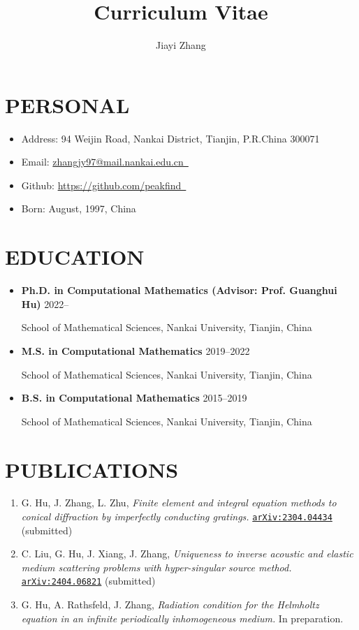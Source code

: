 \documentclass[11pt, letterpaper]{article}
\title{\textbf{Curriculum Vitae}}
\date{}
\author{Jiayi Zhang}
\newcommand{\iconhref}[2]{\href{#1}{#2\ \footnotesize\faExternalLink*}}
\begin{document}
	
	\maketitle
	
	\section{PERSONAL}
	\begin{itemize}[itemsep=1pt]
		\item Address: 94 Weijin Road, Nankai District, Tianjin, P.R.China 300071
		\item Email: \iconhref{mailto:zhangjy97@mail.nankai.edu.cn}{zhangjy97@mail.nankai.edu.cn}
		\item Github: \iconhref{https://github.com/peakfind}{https://github.com/peakfind}
		\item Born: August, 1997, China
	\end{itemize}
	
	\section{EDUCATION}
	\begin{itemize}[itemsep=1pt]
		\item \textbf{Ph.D. in Computational Mathematics (Advisor: Prof. Guanghui Hu)} \hfill 2022--\phantom{2000}
		
		School of Mathematical Sciences, Nankai University, Tianjin, China
		\item \textbf{M.S. in Computational Mathematics} \hfill 2019--2022
		
		School of Mathematical Sciences, Nankai University, Tianjin, China
		\item \textbf{B.S. in Computational Mathematics} \hfill 2015--2019
		
		School of Mathematical Sciences, Nankai University, Tianjin, China
	\end{itemize}

	\section{PUBLICATIONS}
	\begin{enumerate}[itemsep=1pt]
		\item G. Hu, J. Zhang, L. Zhu, \textsl{Finite element and integral equation 
		methods to conical diffraction by imperfectly conducting gratings.} 
		\href{https://arxiv.org/abs/2304.04434}{\texttt{arXiv:2304.04434}} (submitted)
		\item C. Liu, G. Hu, J. Xiang, J. Zhang, \textsl{Uniqueness to inverse acoustic and elastic medium scattering problems with hyper-singular source method.} \href{https://arxiv.org/abs/2404.06821}{\texttt{arXiv:2404.06821}} (submitted)
		\item G. Hu, A. Rathsfeld, J. Zhang, \textsl{Radiation condition for the Helmholtz equation in an infinite periodically inhomogeneous medium.} In preparation.
	\end{enumerate}
\end{document}
